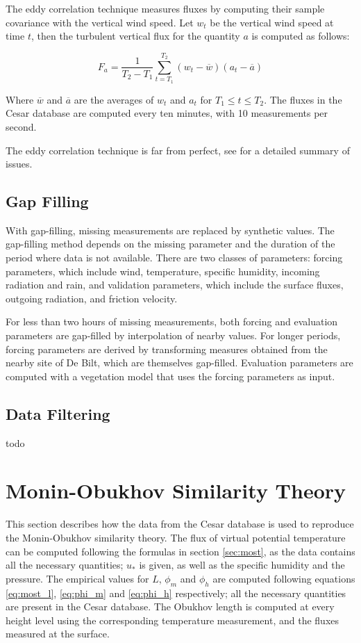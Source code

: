 \documentclass[12pt]{book}
\begin{document}
The eddy correlation technique measures fluxes by computing their sample covariance with the vertical wind speed. Let $w_t$ be the vertical wind speed at time $t$, then the turbulent vertical flux for the quantity $a$ is computed as follows:

$$
F_a=\frac{1}{T_2-T_1}\sum_{t=T_1}^{T_2}(w_t-\overline{w})(a_t-\overline{a})
$$

Where $\overline{w}$ and $\overline{a}$ are the averages of $w_t$ and $a_t$ for $T_1\leq t\leq T_2$. The fluxes in the Cesar database are computed every ten minutes, with 10 measurements per second.

The eddy correlation technique is far from perfect, see \cite{microhandbook} for a detailed summary of issues.

\subsection{Gap Filling}
With gap-filling, missing measurements are replaced by synthetic values. The gap-filling method depends on the missing parameter and the duration of the period where data is not available. There are two classes of parameters: forcing parameters, which include wind, temperature, specific humidity, incoming radiation and rain, and validation parameters, which include the surface fluxes, outgoing radiation, and friction velocity.

For less than two hours of missing measurements, both forcing and evaluation parameters are gap-filled by interpolation of nearby values. For longer periods, forcing parameters are derived by transforming measures obtained from the nearby site of De Bilt, which are themselves gap-filled. Evaluation parameters are computed with a vegetation model that uses the forcing parameters as input.


\subsection{Data Filtering}
todo


\section{Monin-Obukhov Similarity Theory}
This section describes how the data from the Cesar database is used to reproduce the Monin-Obukhov similarity theory. The flux of virtual potential temperature can be computed following the formulas in section \ref{sec:most}, as the data contains all the necessary quantities; $u_*$ is given, as well as the specific humidity and the pressure. The empirical values for $L$, $\phi_m$ and $\phi_h$ are computed following equations \ref{eq:most_l}, \ref{eq:phi_m} and \ref{eq:phi_h} respectively; all the necessary quantities are present in the Cesar database. The Obukhov length is computed at every height level using the corresponding temperature measurement, and the fluxes measured at the surface.
\end{document}
